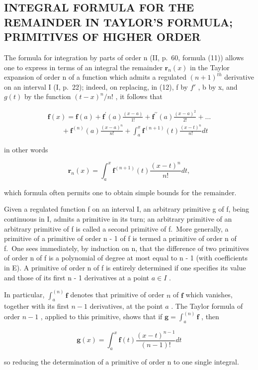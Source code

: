 \subsection{INTEGRAL FORMULA FOR THE REMAINDER IN TAYLOR'S FORMULA; PRIMITIVES OF HIGHER ORDER}

The formula for integration by parts of order n (II, p.~60, formula (11)) allows one to express in terms of an integral the remainder \(\mathbf{r}_{n}(x)\) in the Taylor expansion of order n of a function which admits a regulated \((n+1)^{th}\) derivative on an interval I (I, p.~22); indeed, on replacing, in (12), f by \(f'\) , b by x, and \(g(t)\) by the function \((t-x)^{n}/n!\) , it follows that

\[
\begin{array}{l} \mathbf {f} (x) = \mathbf {f} (a) + \mathbf {f} ^ {\prime} (a) \frac {(x - a)}{1 !} + \mathbf {f} ^ {\prime \prime} (a) \frac {(x - a) ^ {2}}{2 !} + \dots \\ \qquad + \mathbf {f} ^ {(n)} (a) \frac {(x - a) ^ {n}}{n !} + \int_ {a} ^ {x} \mathbf {f} ^ {(n + 1)} (t) \frac {(x - t) ^ {n}}{n !} d t \end{array}\tag{17}
\]

in other words

\[
\mathbf {r} _ {n} (x) = \int_ {a} ^ {x} \mathbf {f} ^ {(n + 1)} (t) \frac {(x - t) ^ {n}}{n !} d t,\tag{18}
\]

which formula often permits one to obtain simple bounds for the remainder.

Given a regulated function f on an interval I, an arbitrary primitive g of f, being continuous in I, admits a primitive in its turn; an arbitrary primitive of an arbitrary primitive of f is called a second primitive of f.~More generally, a primitive of a primitive of order n - 1 of f is termed a primitive of order n of f.~One sees immediately, by induction on n, that the difference of two primitives of order n of f is a polynomial of degree at most equal to n - 1 (with coefficients in E). A primitive of order n of f is entirely determined if one specifies its value and those of its first n - 1 derivatives at a point \(a \in I\) .

In particular, \(\int_{a}^{(n)}\mathbf{f}\) denotes that primitive of order \(n\) of \(\mathbf{f}\) which vanishes, together with its first \(n - 1\) derivatives, at the point \(a\) . The Taylor formula of order \(n - 1\) , applied to this primitive, shows that if \(\mathbf{g} = \int_{a}^{(n)}\mathbf{f}\) , then

\[
\mathbf {g} (x) = \int_ {a} ^ {x} \mathbf {f} (t) \frac {(x - t) ^ {n - 1}}{(n - 1) !} d t\tag{19}
\]

so reducing the determination of a primitive of order n to one single integral.

